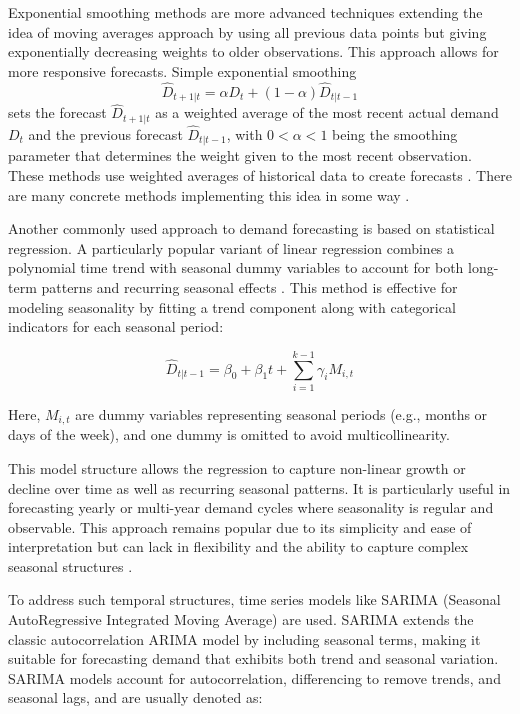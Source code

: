 Exponential smoothing methods are more advanced techniques extending the idea of moving averages approach by using all previous data points but giving exponentially decreasing weights to older observations. This approach allows for more responsive forecasts. Simple exponential smoothing
\begin{equation}
    \hat{D}_{t+1|t} = \alpha D_t + (1 - \alpha) \hat{D}_{t|t-1}
\end{equation}
sets the forecast $\hat{D}_{t+1|t}$ as a weighted average of the most recent actual demand $D_t$ and the previous forecast $\hat{D}_{t|t-1}$, with $0<\alpha<1$ being the smoothing parameter that determines the weight given to the most recent observation. These methods use weighted averages of historical data to create forecasts \cite{Ampountolas2024}. There are many concrete methods implementing this idea in some way \cite{Petricek2021}.

Another commonly used approach to demand forecasting is based on statistical regression. A particularly popular variant of linear regression combines a polynomial time trend with seasonal dummy variables to account for both long-term patterns and recurring seasonal effects \cite{Petricek2021}. This method is effective for modeling seasonality by fitting a trend component along with categorical indicators for each seasonal period:

\begin{equation}
    \hat{D}_{t|t-1} = \beta_0 + \beta_1 t + \sum_{i=1}^{k-1} \gamma_i M_{i,t}
\end{equation}

Here, $M_{i,t}$ are dummy variables representing seasonal periods (e.g., months or days of the week), and one dummy is omitted to avoid multicollinearity.

This model structure allows the regression to capture non-linear growth or decline over time as well as recurring seasonal patterns. It is particularly useful in forecasting yearly or multi-year demand cycles where seasonality is regular and observable. This approach remains popular due to its simplicity and ease of interpretation but can lack in flexibility and the ability to capture complex seasonal structures \cite{Petricek2021}.

To address such temporal structures, time series models like SARIMA (Seasonal AutoRegressive Integrated Moving Average) are used. SARIMA extends the classic autocorrelation ARIMA model by including seasonal terms, making it suitable for forecasting demand that exhibits both trend and seasonal variation. SARIMA models account for autocorrelation, differencing to remove trends, and seasonal lags, and are usually denoted as:

